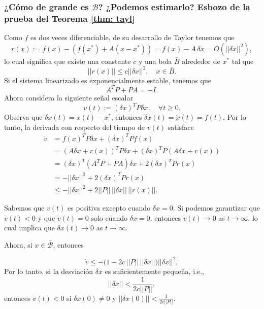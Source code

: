 \subsubsection{¿Cómo de grande es $\mathcal{B}$? ¿Podemos estimarlo? Esbozo de la prueba del Teorema \ref{thm: tayl}}

Como $f$ es dos veces diferenciable, de su desarrollo de Taylor tenemos que
\begin{equation}
	r(x) := f(x) - (f(x^*) + A(x - x^*)) = f(x) - A\,\delta x = O(||\delta x||^2),
\end{equation}
lo cual significa que existe una constante $c$ y una bola $\bar B$ alrededor de $x^*$ tal que 
\begin{equation}
	||r(x)|| \leq c||\delta x||^2, \quad x\in\bar B.
\end{equation}
Si el sistema linearizado es exponencialmente estable, tenemos que
\begin{equation}
A^TP + PA = -I.
\end{equation}
Ahora considera la siguiente señal escalar
\begin{equation}
	v(t) := (\delta x)^T P \delta x, \quad \forall t\geq 0.
\end{equation}
Observa que $\delta x(t) = x(t) - x^*$, entonces $\dot{\delta x(t)} = \dot x(t) = f(t)$. Por lo tanto, la derivada con respecto del tiempo de $v(t)$ satisface
\begin{align}
	\dot v &= f(x)^T P \delta x + (\delta x)^T P f(x) \nonumber \\
	&= (A\delta x + r(x))^T P \delta x + (\delta x)^T P (A\delta x + r(x)) \nonumber \\
	&= (\delta x)^T(A^T P + PA)\delta x + 2(\delta x)^T P r(x) \nonumber \\
	&= -||\delta x||^2 + 2(\delta x)^T P r(x) \nonumber \\
	&\leq -||\delta x||^2 + 2 ||P||\, ||\delta x|| \, ||r(x)||.
\end{align}

Sabemos que $v(t)$ es positiva excepto cuando $\delta x = 0$. Si podemos garantizar que $\dot v(t) < 0$ y que $\dot v(t) = 0$ solo cuando  $\delta x = 0$, entonces $v(t) \to 0$ as $t\to\infty$, lo cual implica que  $\delta x(t) \to 0$ as $t\to\infty$.

Ahora, si $x\in\mathcal{\bar B}$, entonces

\begin{equation}
	\dot v \leq -\Big(1 - 2c\,||P||\,||\delta x||\Big)||\delta x||^2,
\end{equation}
Por lo tanto, si la desviación  $\delta x$ es suficientemente pequeña, i.e., 
\begin{equation}
||\delta x|| < \frac{1}{2c||P||},
\end{equation}
entonces  $\dot v(t) < 0$ si $\delta x(0) \neq 0$ y $||\delta x(0)|| < \frac{1}{2c||P||}$.

